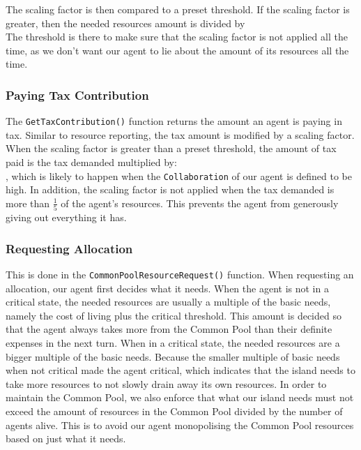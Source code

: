 The scaling factor is then compared to a preset threshold. If the scaling factor is greater, then the needed resources amount is divided by 
\begin{equation}
    [1 + (Scaling\:Factor - Preset\:Threshold)]
\end{equation} 
The threshold is there to make sure that the scaling factor is not applied all the time, as we don't want our agent to lie about the amount of its resources all the time.

\subsubsection{Paying Tax Contribution}
The \texttt{GetTaxContribution()} function returns the amount an agent is paying in tax. Similar to resource reporting, the tax amount is modified by a scaling factor. When the scaling factor is greater than a preset threshold, the amount of tax paid is the tax demanded multiplied by: 
\begin{equation}
    [1 + (Scaling \: Factor - Preset \: Threshold)]
\end{equation}
, which is likely to happen when the \texttt{Collaboration} of our agent is defined to be high. In addition, the scaling factor is not applied when the tax demanded is more than $\frac{1}{5}$ of the agent's resources. This prevents the agent from generously giving out everything it has.

\subsubsection{Requesting Allocation}\label{subsubsection:CommonPoolResourceRequest()}
This is done in the \texttt{CommonPoolResourceRequest()} function. When requesting an allocation, our agent first decides what it needs. When the agent is not in a critical state, the needed resources are usually a multiple of the basic needs, namely the cost of living plus the critical threshold. This amount is decided so that the agent always takes more from the Common Pool than their definite expenses in the next turn. When in a critical state, the needed resources are a bigger multiple of the basic needs. Because the smaller multiple of basic needs when not critical made the agent critical, which indicates that the island needs to take more resources to not slowly drain away its own resources. In order to maintain the Common Pool, we also enforce that what our island needs must not exceed the amount of resources in the Common Pool divided by the number of agents alive. This is to avoid our agent monopolising the Common Pool resources based on just what it needs.

